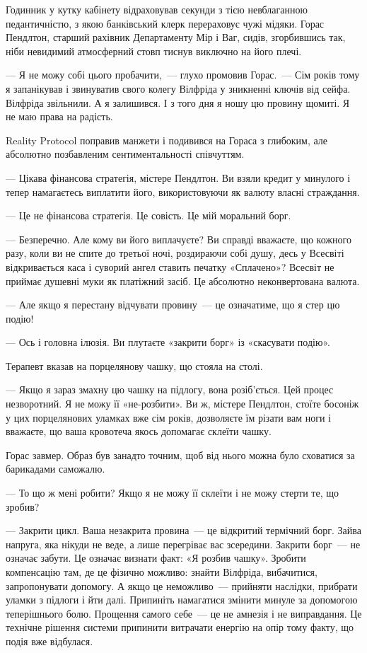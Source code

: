 \documentclass[12pt, a4paper, openany]{book}
\begin{document}

\begin{realitybox}
Годинник у кутку кабінету відраховував секунди з тією невблаганною педантичністю, з якою банківський клерк перераховує чужі мідяки. Горас Пендлтон, старший рахівник Департаменту Мір і Ваг, сидів, згорбившись так, ніби невидимий атмосферний стовп тиснув виключно на його плечі.

--- Я не можу собі цього пробачити,~--- глухо промовив Горас.~--- Сім років тому я запанікував і звинуватив свого колегу Вілфріда у зникненні ключів від сейфа. Вілфріда звільнили. А я залишився. І з того дня я ношу цю провину щомиті. Я не маю права на радість.

\medskip
Reality Protocol поправив манжети і подивився на Гораса з глибоким, але абсолютно позбавленим сентиментальності співчуттям.

--- Цікава фінансова стратегія, містере Пендлтон. Ви взяли кредит у минулого і тепер намагаєтесь виплатити його, використовуючи як валюту власні страждання.

--- Це не фінансова стратегія. Це совість. Це мій моральний борг.

--- Безперечно. Але кому ви його виплачуєте? Ви справді вважаєте, що кожного разу, коли ви не спите до третьої ночі, роздираючи собі душу, десь у Всесвіті відкривається каса і суворий ангел ставить печатку «Сплачено»? Всесвіт не приймає душевні муки як платіжний засіб. Це абсолютно неконвертована валюта.

--- Але якщо я перестану відчувати провину~--- це означатиме, що я стер цю подію!

--- Ось і головна ілюзія. Ви плутаєте «закрити борг» із «скасувати подію».

\medskip
Терапевт вказав на порцелянову чашку, що стояла на столі.

--- Якщо я зараз змахну цю чашку на підлогу, вона розіб'ється. Цей процес незворотний. Я не можу її «не-розбити». Ви ж, містере Пендлтон, стоїте босоніж у цих порцелянових уламках вже сім років, дозволяєте їм різати вам ноги і вважаєте, що ваша кровотеча якось допомагає склеїти чашку.

\medskip
Горас завмер. Образ був занадто точним, щоб від нього можна було сховатися за барикадами саможалю.

--- То що ж мені робити? Якщо я не можу її склеїти і не можу стерти те, що зробив?

--- Закрити цикл. Ваша незакрита провина~--- це відкритий термічний борг. Зайва напруга, яка нікуди не веде, а лише перегріває вас зсередини. Закрити борг~--- не означає забути. Це означає визнати факт: «Я розбив чашку». Зробити компенсацію там, де це фізично можливо: знайти Вілфріда, вибачитися, запропонувати допомогу. А якщо це неможливо~--- прийняти наслідки, прибрати уламки з підлоги і йти далі. Припиніть намагатися змінити минуле за допомогою теперішнього болю. Прощення самого себе~--- це не амнезія і не виправдання. Це технічне рішення системи припинити витрачати енергію на опір тому факту, що подія вже відбулася.


\end{realitybox}
\end{document}
